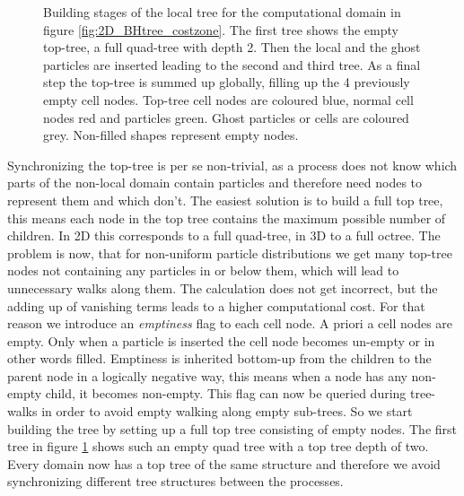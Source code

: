\begin{figure}[htbp]
\begin{center}
\caption{Building stages of the local tree for the computational domain in figure \ref{fig:2D_BHtree_costzone}. The first tree shows the empty top-tree, a full quad-tree with depth 2. Then the local and the ghost particles are inserted leading to the second and third tree. As a final step the top-tree is summed up globally, filling up the 4 previously empty cell nodes. Top-tree cell nodes are coloured blue, normal cell nodes red and particles green. Ghost particles or cells are coloured grey. Non-filled shapes represent empty nodes.}
\label{ch02_fig07}
\end{center}
\end{figure}

Synchronizing the top-tree is per se non-trivial, as a process does not know which parts of the non-local domain contain particles and therefore need nodes to represent them and which don't. The easiest solution is to build a full top tree, this means each node in the top tree contains the maximum possible number of children. In 2D this corresponds to a full quad-tree, in 3D to a full octree. The problem is now, that for non-uniform particle distributions we get many top-tree nodes not containing any particles in or below them, which will lead to unnecessary walks along them. The calculation does not get incorrect, but the adding up of vanishing terms leads to a higher computational cost. For that reason we introduce an \emph{emptiness} flag to each cell node. A priori a cell nodes are empty. Only when a particle is inserted the cell node becomes un-empty or in other words filled. Emptiness is inherited bottom-up from the children to the parent node in a logically negative way, this means when a node has any non-empty child, it becomes non-empty. This flag can now be queried during tree-walks in order to avoid empty walking along empty sub-trees. So we start building the tree by setting up a full top tree consisting of empty nodes. The first tree in figure \ref{ch02_fig07} shows such an empty quad tree with a top tree depth of two. Every domain now has a top tree of the same structure and therefore we avoid synchronizing different tree structures between the processes.


